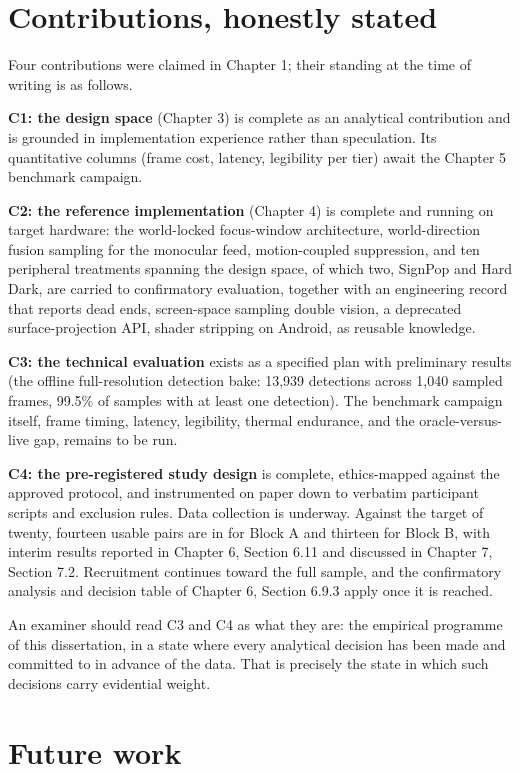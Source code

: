 \section{Contributions, honestly stated}

Four contributions were claimed in Chapter 1; their standing at the time of writing is as follows.

\textbf{C1: the design space} (Chapter 3) is complete as an analytical contribution and is grounded in
implementation experience rather than speculation. Its quantitative columns (frame cost, latency,
legibility per tier) await the Chapter 5 benchmark campaign.

\textbf{C2: the reference implementation} (Chapter 4) is complete and running on target hardware: the
world-locked focus-window architecture, world-direction fusion sampling for the monocular feed,
motion-coupled suppression, and ten peripheral treatments spanning the design space, of which two,
SignPop and Hard Dark, are carried to confirmatory evaluation, together with an engineering record
that reports dead ends, screen-space sampling double vision, a deprecated surface-projection API,
shader stripping on Android, as reusable knowledge.

\textbf{C3: the technical evaluation} exists as a specified plan with preliminary results (the offline
full-resolution detection bake: 13,939 detections across 1,040 sampled frames, 99.5\% of samples with
at least one detection). The benchmark campaign itself, frame timing, latency, legibility, thermal
endurance, and the oracle-versus-live gap, remains to be run.

\textbf{C4: the pre-registered study design} is complete, ethics-mapped against the approved protocol,
and instrumented on paper down to verbatim participant scripts and exclusion rules. Data collection is
underway. Against the target of twenty, fourteen usable pairs are in for Block A and thirteen for
Block B, with interim results reported in
Chapter 6, Section 6.11 and discussed in Chapter 7, Section 7.2. Recruitment continues toward the
full sample, and the confirmatory analysis and decision table of Chapter 6, Section 6.9.3 apply once
it is reached.

An examiner should read C3 and C4 as what they are: the empirical programme of this dissertation, in
a state where every analytical decision has been made and committed to in advance of the data. That
is precisely the state in which such decisions carry evidential weight.

\section{Future work}

